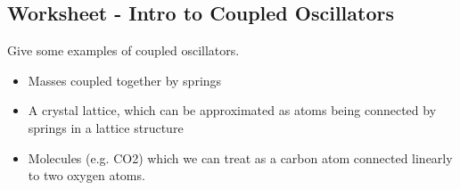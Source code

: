 \documentclass[../PHYS306Notes.tex]{subfiles}
\begin{document}
\subsection{Worksheet - Intro to Coupled Oscillators}
\begin{p}
Give some examples of coupled oscillators.
\end{p}
\begin{s}
\phantom{i}
\begin{itemize}
    \item Masses coupled together by springs
    \item A crystal lattice, which can be approximated as atoms being connected by springs in a lattice structure
    \item Molecules (e.g. CO2) which we can treat as a carbon atom connected linearly to two oxygen atoms.
\end{itemize}
\end{s}
\end{document}
